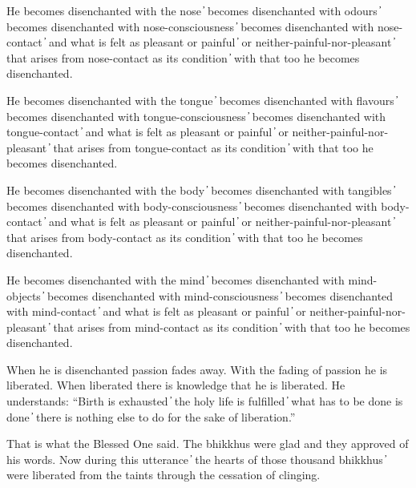 He becomes disenchanted with the nose  ̓  becomes disenchanted with odours  ̓  becomes disenchanted with nose-consciousness  ̓  becomes disenchanted with nose-contact  ̓  and what is felt as pleasant or painful  ̓  or neither-painful-nor-pleasant  ̓  that arises from nose-contact as its condition  ̓  with that too he becomes disenchanted.

He becomes disenchanted with the tongue  ̓  becomes disenchanted with flavours  ̓  becomes disenchanted with tongue-consciousness  ̓  becomes disenchanted with tongue-contact  ̓  and what is felt as pleasant or painful  ̓  or neither-painful-nor-pleasant  ̓  that arises from tongue-contact as its condition  ̓  with that too he becomes disenchanted.

He becomes disenchanted with the body  ̓  becomes disenchanted with tangibles  ̓  becomes disenchanted with body-consciousness  ̓  becomes disenchanted with body-contact  ̓  and what is felt as pleasant or painful  ̓  or neither-painful-nor-pleasant  ̓  that arises from body-contact as its condition  ̓  with that too he becomes disenchanted.

He becomes disenchanted with the mind  ̓  becomes disenchanted with mind-objects  ̓  becomes disenchanted with mind-consciousness  ̓  becomes disenchanted with mind-contact  ̓  and what is felt as pleasant or painful  ̓  or neither-painful-nor-pleasant  ̓  that arises from mind-contact as its condition  ̓  with that too he becomes disenchanted.

When he is disenchanted passion fades away. With the fading of passion he is liberated. When liberated there is knowledge that he is liberated. He understands: “Birth is exhausted  ̓  the holy life is fulfilled  ̓  what has to be done is done  ̓  there is nothing else to do for the sake of liberation.”

That is what the Blessed One said. The bhikkhus were glad and they approved of his words. Now during this utterance  ̓  the hearts of those thousand bhikkhus  ̓  were liberated from the taints through the cessation of clinging.

\suttaRef{[SN 35.28]}
